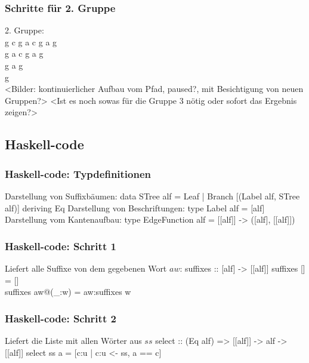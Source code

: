 \documentclass{beamer}
\begin{document}

\begin{frame}[t]
\frametitle{Schritte für 2. Gruppe}
    2. Gruppe:          \\
    g c g a c g a g     \\
    g a c g a g         \\
    g a g               \\
    g                   \\
\bigskip
<Bilder: kontinuierlicher Aufbau vom Pfad, paused?, mit Besichtigung von neuen Gruppen?>
\bigskip
<Ist es noch sowas für die Gruppe 3 nötig oder sofort das Ergebnis zeigen?>
\end{frame}


\subsection{Haskell-code}


\begin{frame}[t]
\frametitle{Haskell-code: Typdefinitionen}
    Darstellung von Suffixbäumen:
    \medskip
    data STree alf = Leaf | Branch [(Label alf, STree alf)] deriving Eq
    \bigskip
    Darstellung von Beschriftungen:
    \medskip
    type Label alf = [alf]
    \bigskip
    Darstellung vom Kantenaufbau:
    \medskip
    type EdgeFunction alf = [[alf]] -> ([alf], [[alf]])
\end{frame}


\begin{frame}[t]
\frametitle{Haskell-code: Schritt 1}
Liefert alle Suffixe von dem gegebenen Wort $aw$:
\bigskip
suffixes :: [alf] -> [[alf]]
\bigskip
suffixes []       = []              \\
suffixes aw@(\_:w) = aw:suffixes w  \\
\end{frame}


\begin{frame}[t]
\frametitle{Haskell-code: Schritt 2}
    Liefert die Liste mit allen Wörter aus $ss$
    \bigskip
    select :: (Eq alf) => [[alf]] -> alf -> [[alf]]
    \bigskip
    select ss a = [c:u | c:u <- ss, a == c]
\end{frame}
\end{document}
